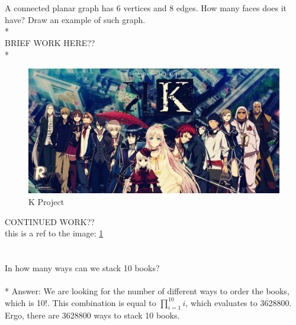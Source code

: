 \documentclass[12pt, letterpaper]{article} %
\begin{document}
\section{} %
A connected planar graph has 6 vertices and 8 edges.  How many faces
does it have?  Draw an example of such graph.
\\*
\\ %
BRIEF WORK HERE??
\\* %

\begin{figure}[h]
  \centering
  \includegraphics[width=\linewidth]{image1}
  \caption{K Project}
  \label{fig:wholesome}
\end{figure}

\noindent CONTINUED WORK??
\\
this is a ref to the image: \ref{fig:wholesome}

\pagebreak %
\section{}
In how many ways can we stack 10 books?
\\ %
\\*
Answer: We are looking for the number of different ways to order the books, which is 10!. This combination is equal to $\prod_{i=1}^{10} i $, which evaluates to 3628800. Ergo, there are 3628800 ways to stack 10 books.
\end{document}
